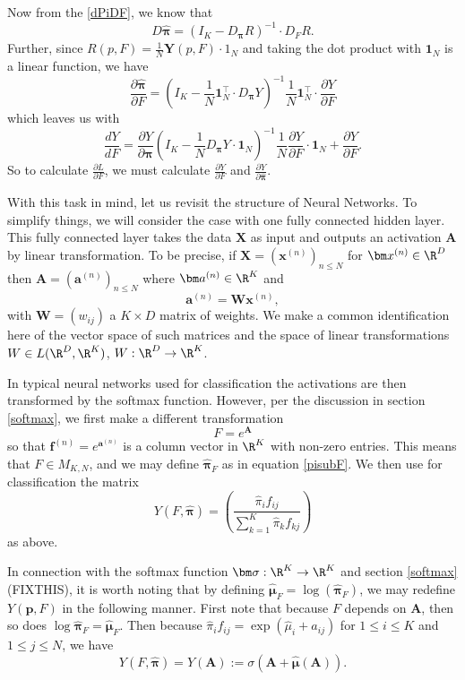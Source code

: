 Now from the \ref{dPiDF}, we know that 
\[D\hat{\bm\pi}=\left(I_K-D_{\bm\pi}R\right)^{-1}\cdot D_{F}R.\]
Further, since \(R(p,F)=\frac{1}{N}\bm Y(p,F)\cdot 1_N\) and taking the dot product with $\bm 1_N$ is a linear function, we have 
\[\frac{\partial\hat{\bm\pi}}{\partial F}=\left(I_K-\frac 1N\bm 1_N^{\intercal}\cdot D_{\bm\pi}Y\right)^{-1}\frac{1}{N}\bm 1_N^{\intercal}\cdot\frac{\partial Y}{\partial F}\]
which leaves us with 
\begin{equation}\label{drVdy}
\frac{d Y}{d F} = \frac{\partial Y}{\partial \hat{\bm\pi}} \left(I_K-\frac 1ND_{\bm\pi}Y\cdot \bm 1_N\right)^{-1}\frac{1}{N}\frac{\partial Y}{\partial F}\cdot \bm 1_N + \frac{\partial Y}{\partial F}.
\end{equation}
So to calculate $\frac{\partial L}{\partial F}$, we must calculate $ \frac{\partial Y}{\partial F}$ and $\frac{\partial Y}{\partial \hat{\bm\pi}}$.

With this task in mind, let us revisit the structure of Neural Networks.  To simplify things, we will consider the case with one fully connected hidden layer.  This fully connected layer takes the data $\bm X$ as input and outputs an activation $\bm A$ by linear transformation.  To be precise, if $\bm X=(\bm x^{(n)})_{n\leq N}$ for $\bm x^{(n)}\in \R^{D}$ then $\bm A=(\bm a^{(n)})_{n\leq N}$ where $\bm a^{(n)}\in \R^{K}$ and
\[\bm a^{(n)}=\bm W\bm x^{(n)},\]
with $\bm W=(w_{ij})$ a $K\times D$ matrix of weights. We make a common identification here of the vector space of such matrices and the space of linear transformations $W\in L(\R^D,\R^K)$, $W:\R^D\rightarrow \R^K$.

In typical neural networks used for classification the activations are then transformed by the softmax function.  However, per the discussion in section \ref{softmax}, we first make a different transformation
\[F=e^{\bm A}\]
so that $\bm f^{(n)}=e^{\bm a^{(n)}}$ is a column vector in $\R^K$ with non-zero entries.  This means that $F\in M_{K,N}$, and we may define $\hat{\bm\pi}_F$ as in equation \ref{pisubF}. We then use for classification the matrix
\[Y(F,\hat{\bm\pi})=\left(\frac{\hat{\pi}_if_{ij}}{\sum_{k=1}^{K}\hat{\pi}_kf_{kj}}\right)\]
as above.  

In connection with the softmax function $\bm\sigma:\R^K\rightarrow\R^K$ and section \ref{softmax} (FIXTHIS), it is worth noting that by defining $\hat{\bm\mu}_F=\log(\hat{\bm\pi}_F)$, we may redefine $Y(\bm p,F)$ in the following manner.  First note that because $F$ depends on $\bm A$, then so does $\log\hat{\bm\pi}_F=\hat{\bm\mu}_F$.  Then because $\hat{\pi}_if_{ij}=\exp(\hat{\mu}_i+a_{ij})$ for $1\leq i\leq K$ and $1\leq j\leq N$, we have 
\begin{equation}
Y(F,\hat{\bm\pi})=Y(\bm A):=\sigma(\bm A+\hat{\bm\mu}(\bm A)).
\end{equation}

